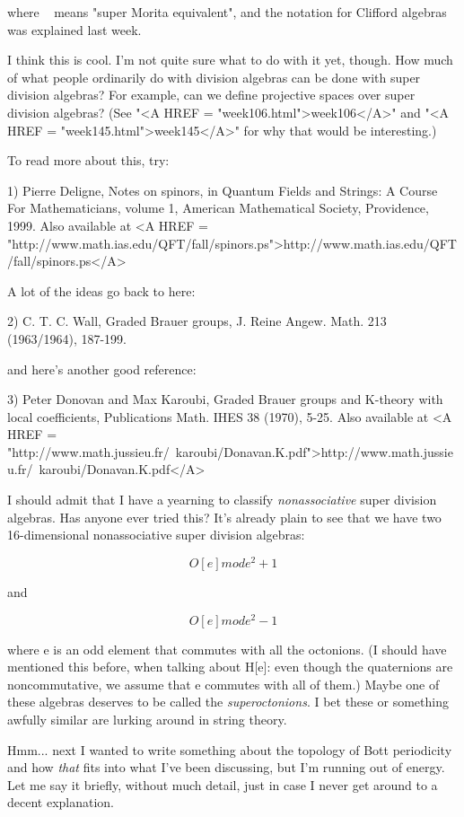 where ~ means "super Morita equivalent", and the notation
for Clifford algebras was explained last week.  

I think this is cool.  I'm not quite sure what to do with it yet,
though.  How much of what people ordinarily do with division algebras
can be done with super division algebras?  For example, can we define
projective spaces over super division algebras?  (See "<A HREF = "week106.html">week106</A>" and
"<A HREF = "week145.html">week145</A>" for why that would be interesting.)

To read more about this, try:

1) Pierre Deligne, Notes on spinors, in Quantum Fields and Strings: 
A Course For Mathematicians, volume 1, American Mathematical Society, 
Providence, 1999.  Also available at 
<A HREF = "http://www.math.ias.edu/QFT/fall/spinors.ps">http://www.math.ias.edu/QFT/fall/spinors.ps</A>

A lot of the ideas go back to here:

2) C. T. C. Wall, Graded Brauer groups, J. Reine Angew. Math. 213
(1963/1964), 187-199.

and here's another good reference:

3) Peter Donovan and Max Karoubi, Graded Brauer groups and K-theory
with local coefficients, Publications Math. IHES 38 (1970), 5-25.
Also available at 
<A HREF = "http://www.math.jussieu.fr/~karoubi/Donavan.K.pdf">http://www.math.jussieu.fr/~karoubi/Donavan.K.pdf</A>

I should admit that I have a yearning to classify \emph{nonassociative}
super division algebras.  Has anyone ever tried this?  It's already 
plain to see that we have two 16-dimensional nonassociative super 
division algebras:


$$

O[e] mod e^{2} + 1
$$
    
and


$$

O[e] mod e^{2} - 1
$$
    

where e is an odd element that commutes with all the octonions.
(I should have mentioned this before, when talking about H[e]:
even though the quaternions are noncommutative, we assume that
e commutes with all of them.)  Maybe one of these algebras 
deserves to be called the \emph{superoctonions}.  I bet these or 
something awfully similar are lurking around in string theory.  

Hmm... next I wanted to write something about the topology of Bott
periodicity and how \emph{that} fits into what I've been discussing,
but I'm running out of energy.  Let me say it briefly, without much
detail, just in case I never get around to a decent explanation.  

